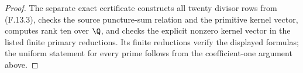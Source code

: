 \begin{proof}
The separate exact certificate
constructs all twenty divisor rows from (F.13.3),
checks the source puncture-sum relation and the
primitive kernel vector, computes rank ten over
$\Q$, and checks the explicit nonzero kernel vector
in the listed finite primary reductions.  Its
finite reductions verify the displayed formulas;
the uniform statement for every prime follows
from the coefficient-one argument above.
\end{proof}
